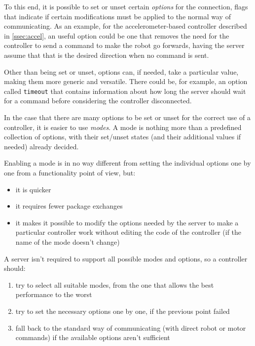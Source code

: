  To this end, it is possible to set or unset certain
  \textit{options} for the connection, flags that indicate if
  certain modifications must be applied to the normal way of
  communicating. As an example, for the accelerometer-based
  controller described in \autoref{ssec:accel}, an useful option could
  be one that removes the need for the controller to send a command
  to make the robot go forwards, having the server assume that that
  is the desired direction when no command is sent.

  Other than being set or unset, options can, if needed, take a
  particular value, making them more generic and versatile. There
  could be, for example, an option called \texttt{timeout} that
  contains information about how long the server should wait for a
  command before considering the controller disconnected.

  In the case that there are many options to be set or unset for the
  correct use of a controller, it is easier to use \textit{modes}. A
  mode is nothing more than a predefined collection of options, with
  their set/unset states (and their additional values if needed)
  already decided.

  \beforelist* Enabling a mode is in no way different from setting the individual
  options one by one from a functionality point of view, but:
  \begin{itemize}
  \item it is quicker
  \item it requires fewer package exchanges
  \item it makes it possible to modify the options needed by the
    server to make a particular controller work without editing the
    code of the controller (if the name of the mode doesn't change)
  \end{itemize}
  \afterlist*
  \beforelist* A server isn't required to support all possible modes and options,
  so a controller should:
  \begin{enumerate}
  \item try to select all suitable modes, from the one that allows
    the best performance to the worst
  \item try to set the necessary options one by one, if the previous
    point failed
  \item fall back to the standard way of communicating (with direct
    robot or motor commands) if the available options aren't
    sufficient
  \end{enumerate}
  \afterlist*
